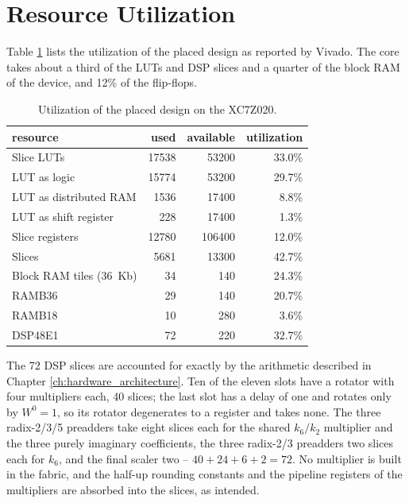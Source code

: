 \documentclass[a4paper,12pt, master]{etf}
\begin{document}
\section{Resource Utilization}
\label{sec:utilization}

Table \ref{tab:utilization} lists the utilization of the placed design as reported by Vivado. The core takes about a third of the LUTs and DSP slices and a quarter of the block RAM of the device, and 12\% of the flip-flops.

\begin{table}[H]
\centering
\caption{Utilization of the placed design on the XC7Z020.}
\medskip
\label{tab:utilization}
\begin{tabular}{l r r r}
\hline
resource & used & available & utilization \\
\hline
\hline
Slice LUTs & 17538 & 53200 & 33.0\% \\
\quad LUT as logic & 15774 & 53200 & 29.7\% \\
\quad LUT as distributed RAM & 1536 & 17400 & 8.8\% \\
\quad LUT as shift register & 228 & 17400 & 1.3\% \\
Slice registers & 12780 & 106400 & 12.0\% \\
Slices & 5681 & 13300 & 42.7\% \\
Block RAM tiles (36~Kb) & 34 & 140 & 24.3\% \\
\quad RAMB36 & 29 & 140 & 20.7\% \\
\quad RAMB18 & 10 & 280 & 3.6\% \\
DSP48E1 & 72 & 220 & 32.7\% \\
\hline
\end{tabular}
\end{table}

The 72 DSP slices are accounted for exactly by the arithmetic described in Chapter \ref{ch:hardware_architecture}. Ten of the eleven slots have a rotator with four multipliers each, 40 slices; the last slot has a delay of one and rotates only by $W^0 = 1$, so its rotator degenerates to a register and takes none. The three radix-2/3/5 preadders take eight slices each for the shared $k_6/k_2$ multiplier and the three purely imaginary coefficients, the three radix-2/3 preadders two slices each for $k_6$, and the final scaler two -- $40 + 24 + 6 + 2 = 72$. No multiplier is built in the fabric, and the half-up rounding constants and the pipeline registers of the multipliers are absorbed into the slices, as intended.
\end{document}
